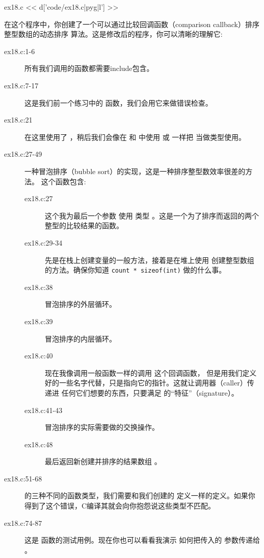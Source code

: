 \begin{code}{ex18.c}
<< d['code/ex18.c|pyg|l'] >>
\end{code}

在这个程序中，你创建了一个可以通过比较回调函数（comparison callback）排序整型数组的动态排序
算法。这是修改后的程序，你可以清晰的理解它:

\begin{description}
\item[ex18.c:1-6] 所有我们调用的函数都需要include包含。
\item[ex18.c:7-17] 这是我们前一个练习中的  函数，我们会用它来做错误检查。
\item[ex18.c:21] 在这里使用了 ，稍后我们会像在  和 
     中使用  或  一样把 
     当做类型使用。
\item[ex18.c:27-49] 一种冒泡排序（bubble sort）的实现，这是一种排序整型数效率很差的方法。
    这个函数包含:
    \begin{description}
    \item[ex18.c:27] 这个我为最后一个参数  使用  类型 
        。这是一个为了排序而返回的两个整型的比较结果的函数。
    \item[ex18.c:29-34] 先是在栈上创建变量的一般方法，接着是在堆上使用  
        创建整型数组的方法。确保你知道 \verb|count * sizeof(int)| 做的什么事。
    \item[ex18.c:38] 冒泡排序的外层循环。
    \item[ex18.c:39] 冒泡排序的内层循环。
    \item[ex18.c:40] 现在我像调用一般函数一样的调用  这个回调函数，
        但是用我们定义好的一些名字代替，只是指向它的指针。这就让调用器（caller）传递进
        任何它们想要的东西，只要满足 的“特征”（signature）。
    \item[ex18.c:41-43] 冒泡排序的实际需要做的交换操作。
    \item[ex18.c:48] 最后返回新创建并排序的结果数组 。
    \end{description}
\item[ex18.c:51-68]  的三种不同的函数类型，我们需要和我们创建的 
     定义一样的定义。如果你得到了这个错误，C编译其就会向你抱怨说这些类型不匹配。
\item[ex18.c:74-87] 这是  函数的测试用例。现在你也可以看看我演示
    如何把传入的  参数传递给 。

\end{description}
